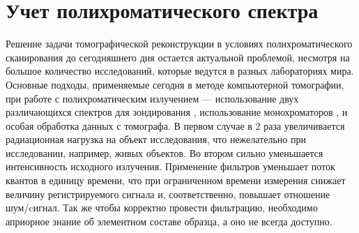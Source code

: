 \begin{comment}

\todo{введение - обзор из статьи аит2013 и бакалаврского диплома}

 Предлагаются новые версии алгоритмов, основанных на алгебраическом подходе, способных работать с сильно зашумлёнными проекциями. Такое условие сформировано необходимостью сокращать время регистрации проекций. Для некоторых применений уменьшение времени регистрации связано с требованием сокращения дозы облучения, для других --- обусловлено высокой динамикой поведения исследуемого объекта. Также следует отметить, что алгебраические методы реконструкции незаменимы, когда речь идет об экспериментах с малым числом проекционных углов и измерениях в ограниченном телесном угле. Только алгебраические методы применимы для решения задач трансмиссионно-эмиссионной томографии, если ослаблением зондирующего и вторичного излучений пренебречь нельзя.




\end{comment}

\section{Учет полихроматического спектра}
Решение задачи томографической реконструкции в условиях полихроматического сканирования \cite{Herman1979bh} до сегодняшнего дня остается актуальной проблемой, несмотря на большое количество исследований, которые ведутся в разных лабораториях мира.
Основные подходы, применяемые сегодня в методе компьютерной томографии, при работе с полихроматическим излучением --- использование двух различающихся спектров для зондирования \cite{graser2009dual, marin_2014_dual_energy_ct}, использование монохроматоров \cite{tan2012beam}, и особая обработка данных с томографа. 
В первом случае в 2 раза увеличивается радиационная нагрузка на объект исследования, что нежелательно при исследовании, например, живых объектов.
Во втором сильно уменьшается интенсивность исходного излучения.
Применение фильтров уменьшает поток квантов в единицу времени, что при ограниченном времени измерения снижает величину регистрируемого сигнала и, соответственно, повышает отношение шум/cигнал. 
Так же чтобы корректно провести фильтрацию, необходимо априорное знание об элементном составе образца, а оно не всегда доступно.

